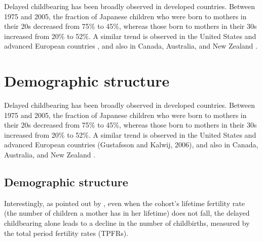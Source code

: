 \documentclass{MBE}%
\begin{document}
{Delayed childbearing has been broadly observed in developed countries. Between 1975 and 2005, the
fraction of Japanese children who were born to mothers in their 20s decreased from 75\% to 45\%,
whereas those born to mothers in their 30s increased from 20\% to 52\%. A similar trend is
observed in the United States and advanced European countries \citet{Bryant_Galtier_Poursat:2005},
and
also in Canada, Australia, and New Zealand \citep{Efron:1979}. %



\section{Demographic structure}

Delayed childbearing has been broadly observed in developed countries. Between 1975 and 2005, the
fraction of Japanese children who were born to mothers in their 20s decreased from 75\% to 45\%,
whereas those born to mothers in their 30s increased from 20\% to 52\%. A similar trend is
observed in the United States and advanced European countries (Gustafsson and Kalwij, 2006), and
also in Canada, Australia, and New Zealand \citep{Efron:1979}.

\subsection{Demographic structure}

Interestingly, as pointed out by \citep{Miller:1974,Efron:1979}, even when the cohort's lifetime
fertility rate (the number of children a mother has in her lifetime) does not fall, the delayed
childbearing alone leads to a decline in the number of childbirths, measured by the total period
fertility rates (TPFRs).

}
\end{document}
